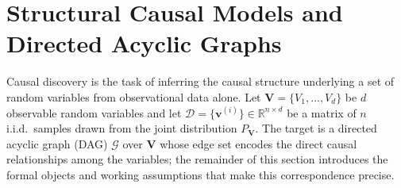 \section{Structural Causal Models and Directed Acyclic Graphs}\label{sec:scms-dags}

Causal discovery is the task of inferring the causal structure underlying a set of random variables from observational data alone.
Let $\mathbf{V} = \{V_1, \ldots, V_d\}$ be $d$ observable random variables and let $\mathcal{D} = \{\mathbf{v}^{(i)}\} \in \mathbb{R}^{n \times d}$ be a matrix of $n$ i.i.d.\ samples drawn from the joint distribution $P_{\mathbf{V}}$.
The target is a directed acyclic graph (DAG) $\mathcal{G}$ over $\mathbf{V}$ whose edge set encodes the direct causal relationships among the variables; the remainder of this section introduces the formal objects and working assumptions that make this correspondence precise.

